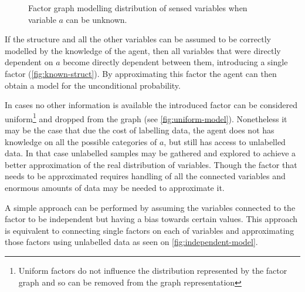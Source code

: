 \begin{figure}[h]
{
}
\caption{\label{fig:known-struct}Factor graph modelling distribution of sensed variables when variable $a$ can be unknown.}
\end{figure}

If the structure and all the other variables can be assumed to be correctly modelled by the
knowledge of the agent, then all variables that were directly dependent on $a$ become directly
dependent between them, introducing a single factor (\autoref{fig:known-struct}).
By approximating this factor the agent can then obtain a model for the unconditional probability.

In cases no other information is available the introduced factor can be considered uniform\footnote{Uniform factors do not influence the
distribution represented by the factor graph and so can be removed from the graph representation}
and dropped from the graph (see \autoref{fig:uniform-model}).
Nonetheless it may be the case that due the cost of labelling data, the agent does not has knowledge
on all the possible categories of $a$, but still has access to unlabelled data.
In that case unlabelled samples may be gathered and explored to achieve a better approximation of
the real distribution of variables.
Though the factor that needs to be approximated requires handling of all the connected variables
and enormous amounts of data may be needed to approximate it.

A simple approach can be performed by assuming the variables connected to the factor to be independent
but having a bias towards certain values. This approach is equivalent to connecting single factors
on each of variables and approximating those factors using unlabelled data as seen on \autoref{fig:independent-model}.


